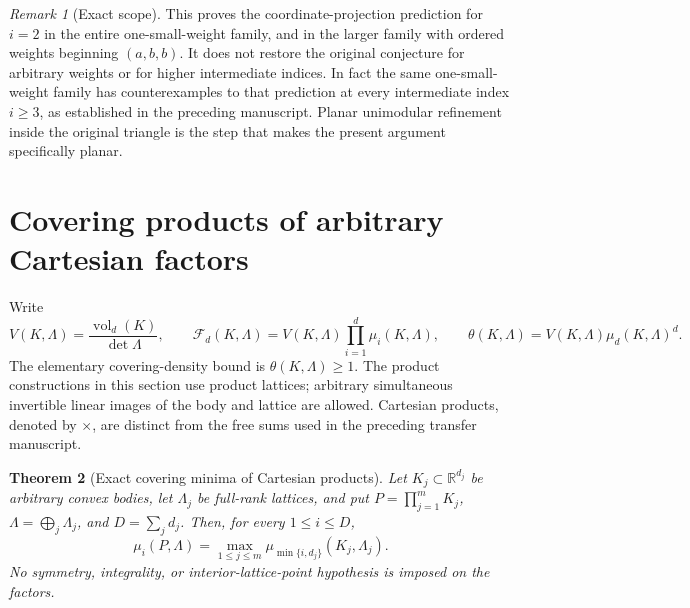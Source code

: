 \documentclass[11pt,a4paper]{article}
\newtheorem{theorem}{Theorem}[section]
\theoremstyle{remark}\newtheorem{remark}[theorem]{Remark}
\begin{document}
\begin{remark}[Exact scope]
This proves the coordinate-projection prediction for $i=2$ in the
entire one-small-weight family, and in the larger family with ordered
weights beginning $(a,b,b)$. It does not restore the original conjecture
for arbitrary weights or for higher intermediate indices. In fact the
same one-small-weight family has counterexamples to that prediction
at every intermediate index $i\ge3$, as established in the preceding
manuscript. Planar unimodular refinement inside the original triangle
is the step that makes the present argument specifically planar.
\end{remark}



\section{Covering products of arbitrary Cartesian factors}
\label{r4f:section}

Write
\[
 V(K,\Lambda)=\frac{\operatorname{vol}_d(K)}{\det\Lambda},\qquad
 \mathcal F_d(K,\Lambda)=V(K,\Lambda)\prod_{i=1}^d\mu_i(K,\Lambda),
 \qquad \theta(K,\Lambda)=V(K,\Lambda)\mu_d(K,\Lambda)^d.
\]
The elementary covering-density bound is $\theta(K,\Lambda)\ge1$.
The product constructions in this section use product lattices;
arbitrary simultaneous invertible linear images of the body and lattice
are allowed. Cartesian products, denoted by $\times$, are distinct
from the free sums used in the preceding transfer manuscript.

\begin{theorem}[Exact covering minima of Cartesian products]
\label{r4f:cartesian-spectrum}
Let $K_j\subset\mathbb R^{d_j}$ be arbitrary convex bodies, let
$\Lambda_j$ be full-rank lattices, and put
$P=\prod_{j=1}^m K_j$, $\Lambda=\bigoplus_j\Lambda_j$, and
$D=\sum_jd_j$. Then, for every $1\le i\le D$,
\begin{equation}
\label{r4f:exact-spectrum}
 \mu_i(P,\Lambda)
 =\max_{1\le j\le m}\mu_{\min\{i,d_j\}}(K_j,\Lambda_j).
\end{equation}
No symmetry, integrality, or interior-lattice-point hypothesis is imposed
on the factors.
\end{theorem}
\end{document}
